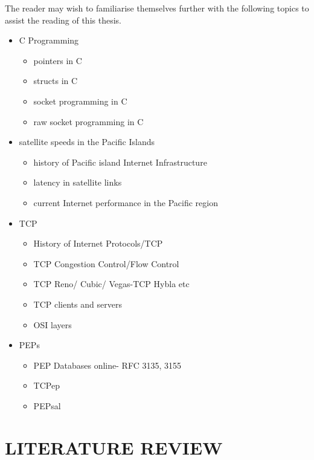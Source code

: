 \documentclass{uathesis}
\begin{document}
The reader may wish to familiarise themselves further with the following topics to assist the reading of this thesis. 
\begin{itemize}
    \item C Programming
        \begin{itemize}
            \item pointers in C 
            \item structs in C 
            \item socket programming in C
            \item raw socket programming in C
        \end{itemize}
    \item satellite speeds in the Pacific Islands
        \begin{itemize}
            \item history of Pacific island Internet Infrastructure
            \item latency in satellite links
            \item current Internet performance in the Pacific region
        \end{itemize}
    \item TCP
        \begin{itemize}
            \item History of Internet Protocols/TCP
            \item TCP Congestion Control/Flow Control
            \item TCP Reno/ Cubic/ Vegas-TCP Hybla etc
            \item TCP clients and servers
            \item OSI layers
        \end{itemize}
   \item PEPs
         \begin{itemize}
            \item PEP Databases online- RFC 3135, 3155
            \item TCPep
            \item PEPsal
        \end{itemize}
\end{itemize}


\chapter{LITERATURE REVIEW}
\end{document}
